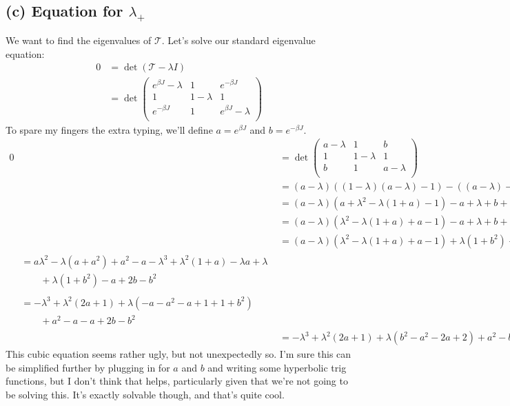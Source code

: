 \documentclass[../../PS3.tex]{subfiles}
\newcommand{\trm}{\mathcal{T}}
\begin{document}
\subsection*{(c) Equation for $\lambda_+$}
We want to find the eigenvalues of $\trm$. Let's solve our standard eigenvalue equation:
\begin{align}
	0 &= \det(\trm - \lambda I)\\
	&= \det \begin{pmatrix}
		 e^{\beta  J } - \lambda & 1 & e^{-\beta  J } \\
		  1 & 1-\lambda & 1 \\
		  e^{-\beta  J } & 1 & e^{\beta  J } -\lambda \\
		\end{pmatrix}
\end{align}
To spare my fingers the extra typing, we'll define $a = e^{\beta  J }$ and $b = e^{-\beta  J}$.
\begin{align}
	0 &= \det \begin{pmatrix}
		 a - \lambda & 1 & b \\
		  1 & 1-\lambda & 1 \\
		  b & 1 & a -\lambda \\
		\end{pmatrix} \\
	&= \left(a - \lambda \right) \left( (1-\lambda)(a - \lambda) - 1 \right) - \left(  (a  - \lambda) - b  \right) + b \left(1 - \left(1 - \lambda \right) b \right) \\
	&= \left(a - \lambda \right) \left( a + \lambda ^2 - \lambda(1 + a) - 1 \right) - a  + \lambda + b + b \left(1 - b + b \lambda  \right) \\
	&= \left(a - \lambda \right) \left(\lambda ^2  - \lambda(1 + a) + a  - 1 \right) - a  + \lambda + b + b - b^2 + b^2 \lambda \\
	&= \left(a - \lambda \right) \left(\lambda ^2  - \lambda(1 + a) + a  - 1 \right) +\lambda (1 + b^2)  - a  + 2 b - b^2 \\
   \begin{split}&= a \lambda^2 - \lambda(a + a^2) + a^2 - a -\lambda^3 + \lambda^2(1 + a) - \lambda a + \lambda \\ &\qquad+\lambda (1 + b^2)  - a  + 2 b - b^2\end{split} \\
   \begin{split}&= -\lambda^3 + \lambda^2\left(2a + 1\right) + \lambda \left( -a - a^2 -a + 1 + 1 + b^2\right) \\ &\qquad+ a^2 - a - a + 2b - b^2\end{split} \\
   &= -\lambda^3 + \lambda^2\left(2a + 1\right) + \lambda \left(b^2 - a^2 -2a + 2\right)+ a^2 - b^2 - 2a + 2b
\end{align}
This cubic equation seems rather ugly, but not unexpectedly so. I'm sure this can be simplified further by plugging in for $a$ and $b$ and writing some hyperbolic trig functions, but I don't think that helps, particularly given that we're not going to be solving this. It's exactly solvable though, and that's quite cool.
\end{document}
